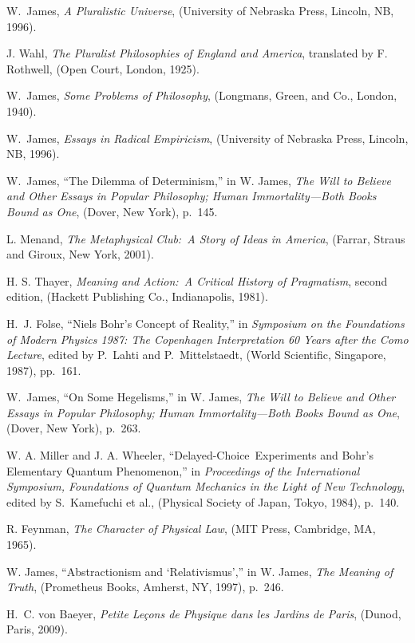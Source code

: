 \begin{thebibliography}{100}
W.~James, {\sl A Pluralistic Universe}, (University of Nebraska Press, Lincoln, NB, 1996).

J. Wahl, {\sl The Pluralist Philosophies of England and America}, translated by F. Rothwell, (Open Court, London, 1925).

W.~James, {\sl Some Problems of Philosophy}, (Longmans, Green, and Co., London, 1940).

W.~James, {\sl Essays in Radical Empiricism}, (University of Nebraska Press, Lincoln, NB, 1996).

W.~James, ``The Dilemma of Determinism,'' in W. James, {\sl The Will to Believe and Other Essays in Popular Philosophy; Human Immortality---Both Books Bound as One}, (Dover, New York), p.~145.

L. Menand, {\sl The Metaphysical Club:\ A Story of Ideas in America}, (Farrar, Straus and Giroux, New York, 2001).

H. S. Thayer, {\sl Meaning and Action:\ A Critical History of Pragmatism}, second edition, (Hackett Publishing Co., Indianapolis, 1981).

H.~J. Folse, ``Niels Bohr's Concept of Reality,'' in {\sl Sym\-posium on the Foundations of Modern Physics 1987: The Copenhagen
Interpretation 60 Years after the Como Lecture}, edited by P.~Lahti and P.~Mittelstaedt, (World Scientific, Singapore, 1987), pp.~161.

W.~James, ``On Some Hegelisms,'' in W. James, {\sl The Will to Believe and Other Essays in Popular Philosophy; Human Immortality---Both Books Bound as One}, (Dover, New York), p.~263.

W. A. Miller and J. A. Wheeler, ``Delayed-Choice~Ex\-periments and
Bohr's Elementary Quantum Phenomenon,'' in {\sl Proceedings of the
International Symposium, Foundations of Quantum Mechanics in the Light
of New Technology}, edited by S.~Kamefuchi et al., (Physical Society of
Japan, Tokyo, 1984), p.~140.

R. Feynman, {\sl The Character of Physical Law}, (MIT Press, Cambridge, MA, 1965).

W. James, ``Abstractionism and `Relativismus','' in W. James, {\sl The Meaning of Truth}, (Prometheus Books, Amherst, NY, 1997), p.~246.

H.~C. von Baeyer, {\sl Petite Le\c{c}ons de Physique dans les Jardins de Paris}, (Dunod, Paris, 2009).


\end{thebibliography}
